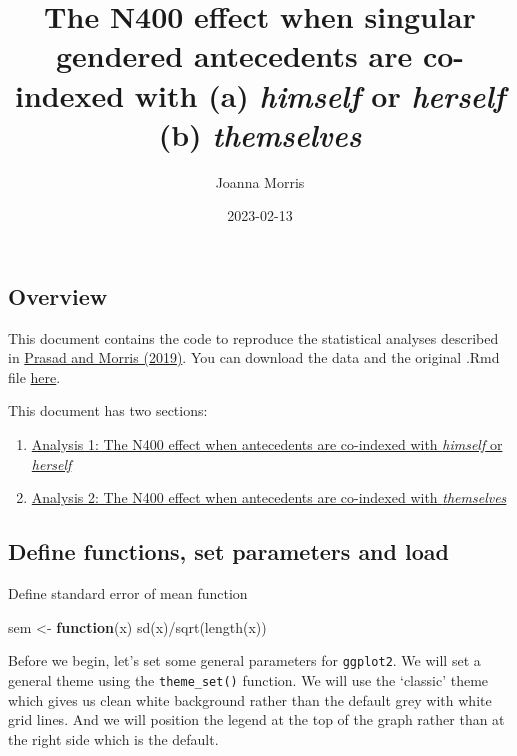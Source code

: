 \documentclass[
]{article}
\title{The N400 effect when singular gendered antecedents are co-indexed
with (a) \emph{himself} or \emph{herself} (b) \emph{themselves}}
\author{Joanna Morris}
\date{2023-02-13}
\newenvironment{Shaded}{\begin{snugshade}}{\end{snugshade}}
\newcommand{\ControlFlowTok}[1]{\textcolor[rgb]{0.13,0.29,0.53}{\textbf{#1}}}
\newcommand{\FunctionTok}[1]{\textcolor[rgb]{0.00,0.00,0.00}{#1}}
\newcommand{\NormalTok}[1]{#1}
\newcommand{\OtherTok}[1]{\textcolor[rgb]{0.56,0.35,0.01}{#1}}
\newcommand{\SpecialCharTok}[1]{\textcolor[rgb]{0.00,0.00,0.00}{#1}}
\providecommand{\tightlist}{%
  \setlength{\itemsep}{0pt}\setlength{\parskip}{0pt}}
\begin{document}
\maketitle

\hypertarget{overview}{%
\subsection{Overview}\label{overview}}

This document contains the code to reproduce the statistical analyses
described in \href{https://psyarxiv.com/hwzke}{Prasad and Morris
(2019)}. You can download the data and the original .Rmd file
\href{https://osf.io/2vjyp/}{here}.

This document has two sections:

\begin{enumerate}
\def\labelenumi{\arabic{enumi}.}
\setcounter{enumi}{1}
\tightlist
\item
  \protect\hyperlink{gender}{Analysis 1: The N400 effect when
  antecedents are co-indexed with \emph{himself} or \emph{herself}}
\item
  \protect\hyperlink{number}{Analysis 2: The N400 effect when
  antecedents are co-indexed with \emph{themselves}}
\end{enumerate}

\hypertarget{define-functions-set-parameters-and-load}{%
\subsection{Define functions, set parameters and
load}\label{define-functions-set-parameters-and-load}}

Define standard error of mean function

\begin{Shaded}
\begin{Highlighting}[]
\NormalTok{sem }\OtherTok{\textless{}{-}} \ControlFlowTok{function}\NormalTok{(x) }\FunctionTok{sd}\NormalTok{(x)}\SpecialCharTok{/}\FunctionTok{sqrt}\NormalTok{(}\FunctionTok{length}\NormalTok{(x))}
\end{Highlighting}
\end{Shaded}

Before we begin, let's set some general parameters for \texttt{ggplot2}.
We will set a general theme using the \texttt{theme\_set()} function. We
will use the `classic' theme which gives us clean white background
rather than the default grey with white grid lines. And we will position
the legend at the top of the graph rather than at the right side which
is the default.
\end{document}

